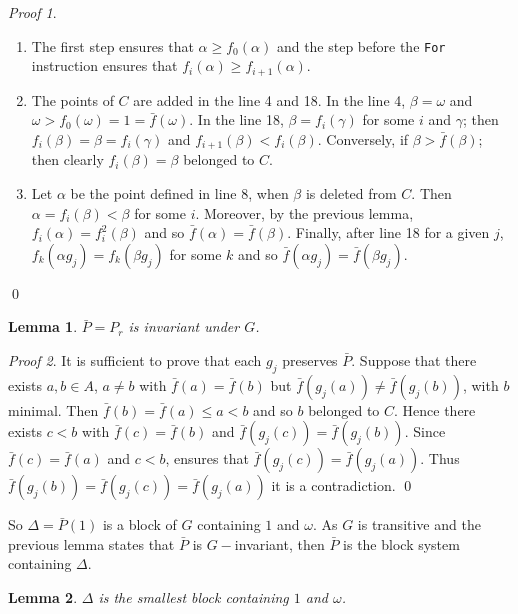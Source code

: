 \documentclass[12pt,a4paper]{book}
\theoremstyle{plain}
\newtheorem{lema}{Lemma}
\theoremstyle{definition}
\theoremstyle{remark}
\newtheorem*{Proof}{Proof}
\begin{document}
\begin{Proof}
 \begin{enumerate}
  \item The first step ensures that $\alpha \geq f_0 ( \alpha)$ and the step before the \texttt{For} instruction ensures that $f_i ( \alpha ) \geq 
        f_{i+1} ( \alpha )$.
 \item  The points of $C$ are added in the line 4 and 18. In the line 4, $\beta = \omega$ and $ \omega  > f_0 ( \omega) = 1 = \bar{f}( \omega)$. 
In the line 18, $\beta = f_i ( \gamma)$ for some $i $ and $ \gamma$; then $f_i ( \beta) = \beta = f_i ( \gamma)$ and $f_{i+1} ( \beta) < f_i (\beta)$. 
Conversely, if $\beta > \bar{f} ( \beta)$; then clearly $f_i ( \beta ) = \beta $ belonged to $C$.

\item Let $\alpha$ be the point defined in line 8, when $\beta$ is deleted from $C$. Then $\alpha = f_i ( \beta) < \beta $ for some $i$. 
Moreover, by the previous lemma, $f_i ( \alpha) = f_i^2( \beta)$ and so $\bar{f}(\alpha) = \bar{f}(\beta)$. Finally, after line 18 for a given 
$j$, $f_k ( \alpha g_j ) = f_k ( \beta g_j)$ for some $k$ and so $ \bar{f} ( \alpha g_j ) = \bar{f} ( \beta g_j )$. 
 \end{enumerate}

\qed  \end{Proof}

\begin{lema}
 $\bar{P} = P_r$ is invariant under $G$.
\end{lema}
\begin{Proof}
 It is sufficient to prove that each $g_j$ preserves $\bar{P}$. Suppose that there exists $a,b \in A$, $a \neq b$ with $\bar{f}(a) = \bar{f} (b)$ but $\bar{f} ( g_j (a)) 
\neq \bar{f}(g_j(b))$,  with  $b$  minimal. Then $\bar{f}(b) = \bar{f}(a) \leq a < b$ and so $b$ belonged to $C$. Hence there exists $c < b$ with 
$\bar{f}(c) = \bar{f}(b)$ and $\bar{f}( g_j(c)) = \bar{f}(g_j (b))$. Since $\bar{f}( c ) = \bar{f}(a)$ and $c < b$, ensures that $\bar{f}( g_j ( c) ) = \bar{f}(g_j(a))$.
Thus $\bar{f}( g_j ( b) ) = \bar{f}(g_j(c)) = \bar{f}(g_j(a))$ it is a contradiction.
\qed  \end{Proof}

So $\Delta = \bar{P}(1)$ is a block of $G$ containing $1$ and $\omega$.  As $G$ is transitive and the previous lemma states  that $\bar{P}$ is 
$G-$invariant, then $\bar{P}$ is the block system containing $\Delta$.

\begin{lema}
 $\Delta$ is the smallest block containing $1$ and $\omega$.
\end{lema}
\end{document}
